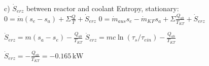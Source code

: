c) \( \dot{S}_{erz} \) between reactor and coolant  
Entropy, stationary: \( 0 = \dot{m}(s_e - s_a) + \Sigma \frac{Q}{T} + \dot{S}_{erz} \)  
\( 0 = \dot{m}_{aus} s_e - \dot{m}_{KF} s_a + \Sigma \frac{Q_{ab}}{T_{KT}} + \dot{S}_{erz} \)  

\( \dot{S}_{erz} = m(s_a - s_e) - \frac{Q_{ab}}{T_{KT}} \)  
\( \dot{S}_{erz} = m c \ln(\tau_s/\tau_{ein}) - \frac{Q_{ab}}{T_{KT}} \)  

\( \dot{S}_{erz} = -\frac{Q_{ab}}{T_{KT}} = -0.165 \, \text{kW} \)